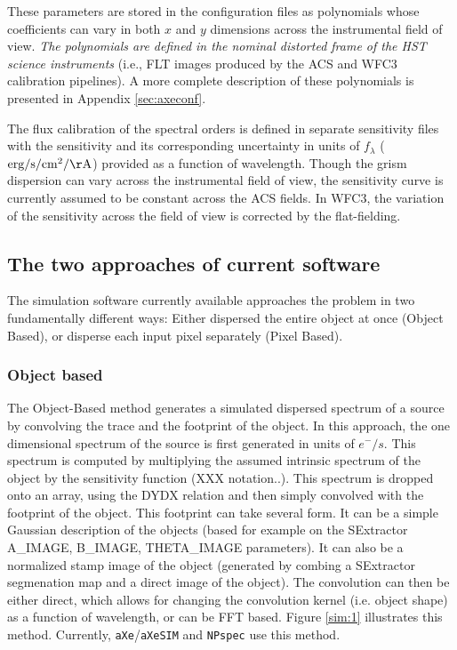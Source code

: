 \documentclass[preprint]{aastex}
\begin{document}
These parameters are stored in the configuration files as polynomials whose coefficients can vary in both $x$ and $y$ dimensions across the instrumental field of view.  \textit{The polynomials are defined in the nominal distorted frame of the \textit{HST} science instruments} (i.e., FLT images produced by the ACS and WFC3 calibration pipelines). A more complete description of these polynomials is presented in Appendix \ref{sec:axeconf}.

The flux calibration of the spectral orders is defined in separate sensitivity files with the sensitivity and its corresponding uncertainty in units of $f_\lambda$ ($\mathrm{erg/s/cm^2/\AA}$) provided as a function of wavelength.  Though the grism dispersion can vary across the instrumental field of view, the sensitivity curve is currently assumed to be constant across the ACS fields. In WFC3, the variation of the sensitivity across the field of view is corrected by the flat-fielding.



\subsection{The two approaches of current software}
The simulation software currently available approaches the problem in two fundamentally different ways: Either dispersed the entire object at once (Object Based), or disperse each input pixel separately (Pixel Based).

\subsubsection{Object based}

The Object-Based method generates a simulated dispersed spectrum of a source by convolving the trace and the footprint of the object. In this approach, the one dimensional spectrum of the source is first generated in units of $e^-/s$. This spectrum is computed by multiplying the assumed intrinsic spectrum of the object by the sensitivity function (XXX notation..). This spectrum is dropped onto an array, using the DYDX relation and then simply convolved with the footprint of the object. This footprint can take several form. It can be a simple Gaussian description of the objects (based for example on the SExtractor A\_IMAGE, B\_IMAGE, THETA\_IMAGE parameters). It can also be a normalized stamp image of the object (generated by combing a SExtractor segmenation map and a direct image of the object). The convolution can then be either direct, which allows for changing the convolution kernel (i.e. object shape) as a function of wavelength, or can be FFT based.
Figure \ref{sim:1} illustrates this method. Currently, \texttt{aXe}/\texttt{aXeSIM} and \texttt{NPspec} use this method. 
\end{document}
